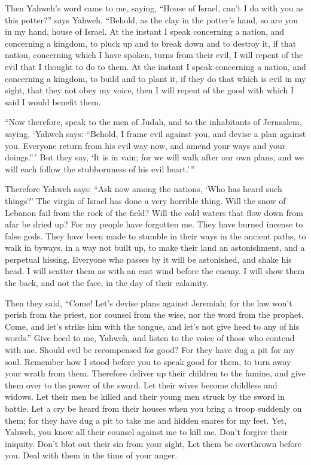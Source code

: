  Then Yahweh's word came to me, saying, 
``House of Israel, can't I do with you as this potter?'' says Yahweh.
``Behold, as the clay in the potter's hand, so are you in my hand, house
of Israel.  At the instant I speak concerning a nation,
and concerning a kingdom, to pluck up and to break down and to destroy
it,  if that nation, concerning which I have spoken, turns
from their evil, I will repent of the evil that I thought to do to them.
 At the instant I speak concerning a nation, and
concerning a kingdom, to build and to plant it,  if they
do that which is evil in my sight, that they not obey my voice, then I
will repent of the good with which I said I would benefit them.

 ``Now therefore, speak to the men of Judah, and to the
inhabitants of Jerusalem, saying, `Yahweh says: ``Behold, I frame evil
against you, and devise a plan against you. Everyone return from his
evil way now, and amend your ways and your doings.''\,' 
But they say, `It is in vain; for we will walk after our own plans, and
we will each follow the stubbornness of his evil heart.'\,''

 Therefore Yahweh says: ``Ask now among the nations, `Who
has heard such things?' The virgin of Israel has done a very horrible
thing.  Will the snow of Lebanon fail from the rock of
the field? Will the cold waters that flow down from afar be dried up?
 For my people have forgotten me. They have burned
incense to false gods. They have been made to stumble in their ways in
the ancient paths, to walk in byways, in a way not built up,
 to make their land an astonishment, and a perpetual
hissing. Everyone who passes by it will be astonished, and shake his
head.  I will scatter them as with an east wind before
the enemy. I will show them the back, and not the face, in the day of
their calamity.

 Then they said, ``Come! Let's devise plans against
Jeremiah; for the law won't perish from the priest, nor counsel from the
wise, nor the word from the prophet. Come, and let's strike him with the
tongue, and let's not give heed to any of his words.'' 
Give heed to me, Yahweh, and listen to the voice of those who contend
with me.  Should evil be recompensed for good? For they
have dug a pit for my soul. Remember how I stood before you to speak
good for them, to turn away your wrath from them. 
Therefore deliver up their children to the famine, and give them over to
the power of the sword. Let their wives become childless and widows. Let
their men be killed and their young men struck by the sword in battle.
 Let a cry be heard from their houses when you bring a
troop suddenly on them; for they have dug a pit to take me and hidden
snares for my feet.  Yet, Yahweh, you know all their
counsel against me to kill me. Don't forgive their iniquity. Don't blot
out their sin from your sight, Let them be overthrown before you. Deal
with them in the time of your anger.

